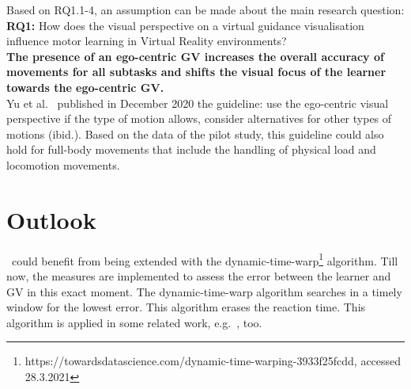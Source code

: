 Based on RQ1.1-4, an assumption can be made about the main research question:\\
\textbf{RQ1:} How does the visual perspective on a virtual guidance visualisation influence motor learning in Virtual Reality environments?\\
\textbf{The presence of an ego-centric GV increases the overall accuracy of movements for all subtasks and shifts the visual focus of the learner towards the ego-centric GV.}\\

Yu et al.~\cite{perspectivematters} published in December 2020 the guideline: use the ego-centric visual perspective if the type of motion allows, consider alternatives for other types of motions (ibid.). Based on the data of the pilot study, this guideline could also hold for full-body movements that include the handling of physical load and locomotion movements.

\section{Outlook}
\label{sec:outlook}
\exgo\ could benefit from being extended with the dynamic-time-warp\footnote{https://towardsdatascience.com/dynamic-time-warping-3933f25fcdd, accessed 28.3.2021} algorithm. Till now, the measures are implemented to assess the error between the learner and GV in this exact moment. The dynamic-time-warp algorithm searches in a timely window for the lowest error. This algorithm erases the reaction time. This algorithm is applied in some related work, e.g.~\cite{thaichichua}, too.\\

